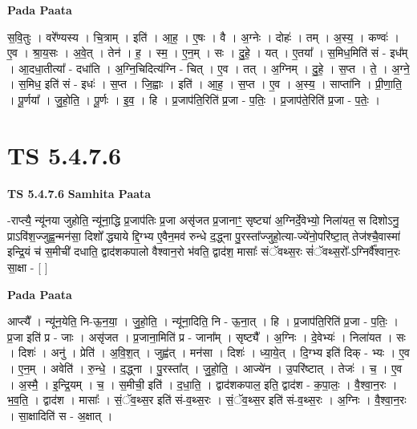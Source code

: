 \documentclass[17pt]{extarticle}
\begin{document}
\textbf{Pada Paata} \newline

स॒वि॒तुः । वरे᳚ण्यस्य । चि॒त्राम् । इति॑ । आ॒ह॒ । ए॒षः । वै । अ॒ग्नेः । दोहः॑ । तम् । अ॒स्य॒ । कण्वः॑ । ए॒व । श्रा॒य॒सः । अ॒वे॒त् । तेन॑ । ह॒ । स्म॒ । ए॒न॒म् । सः । दु॒हे॒ । यत् । ए॒तया᳚ । स॒मिध॒मिति॑ सं - इध᳚म् । आ॒दधा॒तीत्या᳚ - दधा॑ति । अ॒ग्नि॒चिदित्य॑ग्नि - चित् । ए॒व । तत् । अ॒ग्निम् । दु॒हे॒ । स॒प्त । ते॒ । अ॒ग्ने॒ । स॒मिध॒ इति॑ सं - इधः॑ । स॒प्त । जि॒ह्वाः । इति॑ । आ॒ह॒ । स॒प्त । ए॒व । अ॒स्य॒ । साप्ता॑नि । प्री॒णा॒ति॒ । पू॒र्णया᳚ । जु॒हो॒ति॒ । पू॒र्णः । इ॒व॒ । हि । प्र॒जाप॑ति॒रिति॑ प्र॒जा - प॒तिः॒ । प्र॒जाप॑ते॒रिति॑ प्र॒जा - प॒तेः॒ ।  \newline




\section*{ TS 5.4.7.6 }

\textbf{TS 5.4.7.6 } \newline
\textbf{Samhita Paata} \newline

-राप्त्यै॒ न्यू॑नया जुहोति॒ न्यू॑ना॒द्धि प्र॒जाप॑तिः प्र॒जा असृ॑जत प्र॒जानाꣳ॒॒ सृष्ट्या॑ अ॒ग्निर्दे॒वेभ्यो॒ निला॑यत॒ स दिशोऽनु॒ प्राऽवि॑श॒ज्जुह्व॒न्मन॑सा॒ दिशो᳚ द्ध्याये द्दि॒ग्भ्य ए॒वैन॒मव॑ रुन्धे द॒द्ध्ना पु॒रस्ता᳚ज्जुहो॒त्या-ज्ये॑नो॒परि॑ष्टा॒त् तेज॑श्चै॒वास्मा॑ इन्द्रि॒यं च॑ स॒मीची॑ दधाति॒ द्वाद॑शकपालो वैश्वान॒रो भ॑वति॒ द्वाद॑श॒ मासाः᳚ संॅवथ्स॒रः सं॑ॅवथ्स॒रो᳚-ऽग्निर्वै᳚श्वान॒रः सा॒क्षा - [  ] \newline

\textbf{Pada Paata} \newline

आप्त्यै᳚ । न्यू॑न॒येति॒ नि-ऊ॒न॒या॒ । जु॒हो॒ति॒ । न्यू॑ना॒दिति॒ नि - ऊ॒ना॒त् । हि । प्र॒जाप॑ति॒रिति॑ प्र॒जा - प॒तिः॒ । प्र॒जा इति॑ प्र - जाः । असृ॑जत । प्र॒जाना॒मिति॑ प्र - जाना᳚म् । सृष्ट्यै᳚ । अ॒ग्निः । दे॒वेभ्यः॑ । निला॑यत । सः । दिशः॑ । अनु॑ । प्रेति॑ । अ॒वि॒श॒त् । जुह्व॑त् । मन॑सा । दिशः॑ । ध्या॒ये॒त् । दि॒ग्भ्य इति॑ दिक् - भ्यः । ए॒व । ए॒न॒म् । अवेति॑ । रु॒न्धे॒ । द॒द्ध्ना । पु॒रस्ता᳚त् । जु॒हो॒ति॒ । आज्ये॑न । उ॒परि॑ष्टात् । तेजः॑ । च॒ । ए॒व । अ॒स्मै॒ । इ॒न्द्रि॒यम् । च॒ । स॒मीची॒ इति॑ । द॒धा॒ति॒ । द्वाद॑शकपाल॒ इति॒ द्वाद॑श - क॒पा॒लः॒ । वै॒श्वा॒न॒रः । भ॒व॒ति॒ । द्वाद॑श । मासाः᳚ । सं॒ॅव॒थ्स॒र इति॑ सं-व॒थ्स॒रः । सं॒ॅव॒थ्स॒र इति॑ सं-व॒थ्स॒रः । अ॒ग्निः । वै॒श्वा॒न॒रः । सा॒क्षादिति॑ स - अ॒क्षात् ।  \newline
\end{document}
